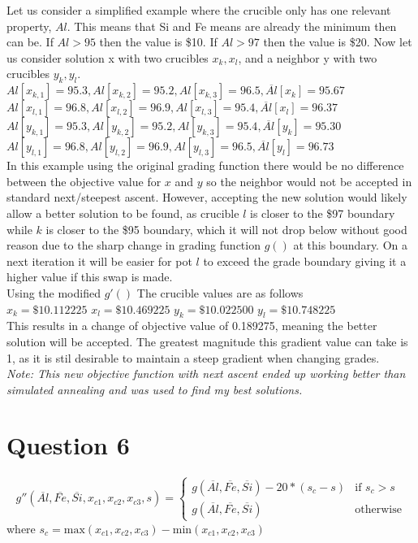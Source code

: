 \documentclass{article}
\begin{document}
Let us consider a simplified example where the crucible only has one 
relevant property, $Al$. This means that Si and Fe means are already 
the minimum then can be. If $Al > 95$ then the value is \$10. If 
$Al > 97$ then the value is \$20. Now let us consider solution x with 
two crucibles $x_k, x_l$, and a neighbor y with two crucibles $y_k, y_l$. \\
$Al[x_{k,1}]=95.3,Al[x_{k,2}]=95.2,Al[x_{k,3}]=96.5,\overline{Al}[x_k]=95.67$\\
$Al[x_{l,1}]=96.8,Al[x_{l,2}]=96.9,Al[x_{l,3}]=95.4,\overline{Al}[x_l]=96.37$\\
$Al[y_{k,1}]=95.3,Al[y_{k,2}]=95.2,Al[y_{k,3}]=95.4,\overline{Al}[y_k]=95.30$\\
$Al[y_{l,1}]=96.8,Al[y_{l,2}]=96.9,Al[y_{l,3}]=96.5,\overline{Al}[y_l]=96.73$\\

In this example using the original grading function there would be no
difference between the objective value for $x$ and $y$ so the neighbor
would not be accepted in standard next/steepest ascent. However, 
accepting the new solution would likely allow a better solution to be 
found, as crucible $l$ is closer to the \$97 boundary while
$k$ is closer to the \$95 boundary, which it will not drop below without
good reason due to the sharp change in grading function $g()$ at this
boundary. On a next iteration it will be easier for pot $l$ to exceed
the grade boundary giving it a higher value if this swap is made.\\

Using the modified $g'()$ The crucible values are as follows\\
$x_k = \$10.112225$ 
$x_l = \$10.469225$ 
$y_k = \$10.022500$ 
$y_l = \$10.748225$ \\
This results in a change of objective value of 0.189275, meaning the
better solution will be accepted. The greatest magnitude this gradient
value can take is 1, as it is stil desirable to maintain a steep 
gradient when changing grades. \\

\textit{Note: This new objective function with next ascent ended up
working better than simulated annealing and was used to find my best
solutions.}

\section{Question 6}
$$g''(\overline{Al}, \overline{Fe}, \overline{Si}, x_{c1}, x_{c2}, 
x_{c3}, s) =
\begin{cases}
    g(\overline{Al}, \overline{Fe}, \overline{Si}) - 20*(s_c - s) & \text{if } s_c > s \\
    g(\overline{Al}, \overline{Fe}, \overline{Si}) & \text{otherwise}
\end{cases}$$ where
$s_c = \text{max}(x_{c1}, x_{c2}, x_{c3}) - \text{min}(x_{c1}, x_{c2}, x_{c3})$
\end{document}
